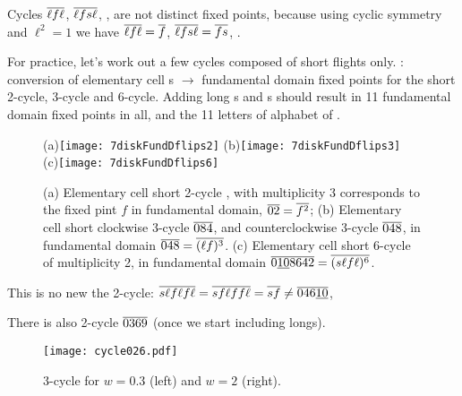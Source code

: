 Cycles ${\overline{\ell f\ell}}$,
${\overline{\ell fs\ell}}$,
\etc, are not distinct fixed points, because using cyclic symmetry and
$\ell^2 =1$ we have
 ${\overline{\ell f\ell}}={\overline{f}}$,
${\overline{\ell fs\ell}}={\overline{fs}}$, \etc.


For practice, let's work out a
few  cycles composed of short flights only.
: conversion of elementary cell \po s $\to$
fundamental domain fixed points for the short 2-cycle, 3-cycle and
6-cycle.
Adding long \po s and \rpo s should result in 11 fundamental domain fixed
points in all, and the 11 letters of alphabet of .

\begin{figure}
\begin{center}
(a)\texttt{[image: 7diskFundDflips2]}
(b)\texttt{[image: 7diskFundDflips3]}
\\
(c)\texttt{[image: 7diskFundDflips6]}
\end{center}
\caption{
(a) Elementary cell short 2-cycle , with multiplicity 3 corresponds to
the fixed pint $f$ in fundamental domain, ${\overline{02}}={\overline{f^2}}$;
(b) Elementary cell short clockwise 3-cycle ${\overline{084}}$, and
counterclockwise 3-cycle ${\overline{048}}$, in
fundamental domain ${\overline{048}}={\overline{(\ell f)^3}}$.
(c) Elementary cell short 6-cycle of multiplicity 2, in
fundamental domain ${\overline{0\underline{10}8642}}={\overline{(s\ell f\ell )^6}}$.
    }
\label{7diskFundDflips2A}
\end{figure}

This is no new the 2-cycle:
$ {\overline{s \ell f \ell f \ell}}
= {\overline{s f \ell f f \ell}}
= {\overline{s f}}
\neq {\ensuremath{\overline{046\underline{10}}}}$,

There is also 2-cycle ${\overline{0369}}$ (once we start including longs).

\begin{figure}
\texttt{[image: cycle026.pdf]}
\caption{3-cycle  for $w=0.3$ (left) and $w=2$ (right). }
\label{fig:cycle026A}
\end{figure}

